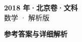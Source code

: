 \documentclass[zihao=-4, a4paper]{ctexart}
\begin{document}
\begin{center}
  {\Large\bfseries 2018 年·北京卷·文科}\\[4pt]
  {\large 数学 · 解析版}
\end{center}
\medskip
{}

\clearpage
{}
\begin{center}{\Large\bfseries 参考答案与详细解析}\end{center}
\medskip

\end{document}
